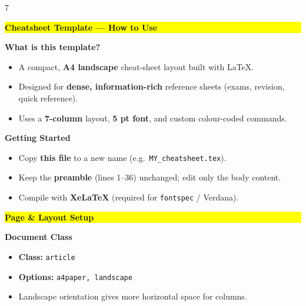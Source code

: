 \documentclass[a4paper,landscape]{article}
\begin{document}
\fontsize{5pt}{5pt}\selectfont
\raggedright
\begin{multicols}{7}

\newcommand{\hlhighlight}[1]{%
    \begingroup
        \setlength{\fboxsep}{0pt}
        \colorbox{yellow}{\strut\textbf{#1}}%
    \endgroup
}
\newcommand{\sectitle}[1]{\textcolor{sectitlecolor}{\textbf{#1}}}
\newcommand{\concept}[1]{\textcolor{conceptcolor}{\textbf{#1}}}
\newcommand{\procname}[1]{\textcolor{procnamecolor}{\textbf{#1}}}
\newcommand{\category}[1]{\textcolor{categorycolor}{\textbf{#1}}}
\newcommand{\lbl}[1]{\textcolor{categorycolor}{\textbf{#1}}}
\newcommand{\lblnb}[1]{\textcolor{categorycolor}{#1}}


\hlhighlight{Cheatsheet Template — How to Use}

\sectitle{What is this template?}
\begin{itemize}
\item A compact, \concept{A4 landscape} cheat-sheet layout built with \LaTeX.
\item Designed for \concept{dense, information-rich} reference sheets (exams, revision, quick reference).
\item Uses a \concept{7-column} layout, \concept{5 pt font}, and custom colour-coded commands.
\end{itemize}

\sectitle{Getting Started}
\begin{itemize}
\item Copy \textbf{this file} to a new name (e.g.\ \texttt{MY\_cheatsheet.tex}).
\item Keep the \concept{preamble} (lines 1–36) unchanged; edit only the body content.
\item Compile with \concept{XeLaTeX} (required for \texttt{fontspec} / Verdana).
\end{itemize}


\hlhighlight{Page \& Layout Setup}

\sectitle{Document Class}
\begin{itemize}
\item \lbl{Class:} \texttt{article}
\item \lbl{Options:} \texttt{a4paper, landscape}
\item Landscape orientation gives more horizontal space for columns.
\end{itemize}


\end{multicols}
\end{document}
